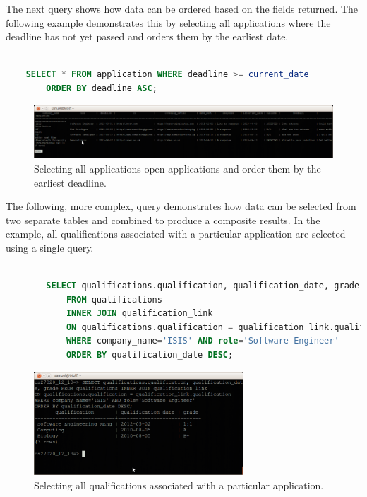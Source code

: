 \documentclass{article}
\begin{document}
The next query shows how data can be ordered based on the fields returned. The following example demonstrates this by selecting all applications where the deadline has not yet passed and orders them by the earliest date.

\begin{center}
	\begin{lstlisting}[language=sql, showstringspaces=false]

	SELECT * FROM application WHERE deadline >= current_date 
		ORDER BY deadline ASC;

	\end{lstlisting}
\end{center}

\begin{figure}[H]
\centering
\includegraphics[width=1\textwidth]{img/test/test-earliest-date.png}
\caption{Selecting all applications open applications and order them by the earliest deadline.}
\label{fig:test-earliest-date}
\end{figure}

The following, more complex, query demonstrates how data can be selected from two separate tables and combined to produce a composite results. In the example, all qualifications associated with a particular application are selected using a single query.

\begin{center}
	\begin{lstlisting}[language=sql, showstringspaces=false]

		SELECT qualifications.qualification, qualification_date, grade 
			FROM qualifications 
			INNER JOIN qualification_link 
			ON qualifications.qualification = qualification_link.qualification]
			WHERE company_name='ISIS' AND role='Software Engineer'
			ORDER BY qualification_date DESC;

	\end{lstlisting}
\end{center}

\begin{figure}[H]
\centering
\includegraphics[width=0.7\textwidth]{img/test/test-qual-link.png}
\caption{Selecting all qualifications associated with a particular application.}
\label{fig:test-qual-link}
\end{figure}
\end{document}

